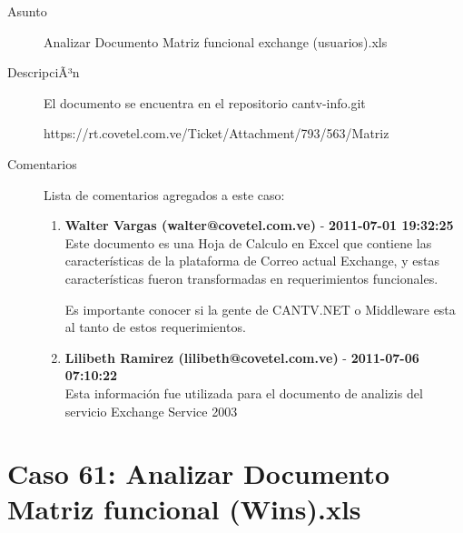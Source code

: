 \begin{description}

\item[Asunto] Analizar Documento Matriz funcional exchange (usuarios).xls\item[DescripciÃ³n] El documento se encuentra en el repositorio cantv-info.git

https://rt.covetel.com.ve/Ticket/Attachment/793/563/Matriz%

\item[Comentarios] Lista de comentarios agregados a este caso:  
\begin{enumerate}
        \item {\bfseries Walter Vargas (walter@covetel.com.ve)  } - {\bfseries 2011-07-01 19:32:25} \\ Este documento es una Hoja de Calculo en Excel que contiene las características
de la plataforma de Correo actual Exchange, y estas características fueron
transformadas en requerimientos funcionales.

Es importante conocer si la gente de CANTV.NET o Middleware esta al tanto de
estos requerimientos.        \item {\bfseries Lilibeth Ramirez (lilibeth@covetel.com.ve)  } - {\bfseries 2011-07-06 07:10:22} \\ Esta información fue utilizada para el documento de analizis del servicio
Exchange Service 2003    \end{enumerate}

\end{description}

\section{Caso 61: Analizar Documento Matriz funcional (Wins).xls  }

